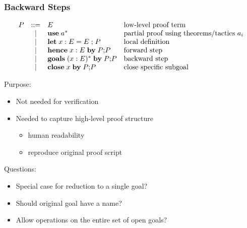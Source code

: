 \documentclass{beamer}
\begin{document}
\begin{frame}\frametitle{Backward Steps}
\[
\begin{array}{lcll}
P       &::=& E & \text{low-level proof term}\\
        &|&   \mathbf{use}\; a^* & \text{partial proof using theorems/tactics $a_i$}\\
        &|&   \mathbf{let}\; x:E=E\; \mathbf{;}\; P & \text{local definition}\\
        &|&   \mathbf{hence}\;x:E\; \mathbf{by}\; P\mathbf{;} P & \text{forward step} \\
        &|&   \mathbf{goals}\;(x:E)^*\; \mathbf{by}\; P\mathbf{;} P & \text{backward step} \\
        &|&   \mathbf{close}\;x\; \mathbf{by}\; P\mathbf{;} P & \text{close specific subgoal} \\
\end{array}
\]

Purpose:
\begin{itemize}
\item Not needed for verification
\item Needed to capture high-level proof structure
  \begin{itemize}
  \item human readability
  \item reproduce original proof script
  \end{itemize}
\end{itemize}

Questions:
\begin{itemize}
\item Special case for reduction to a single goal?
\item Should original goal have a name?
\item Allow operations on the entire set of open goals?
\end{itemize}

\end{frame}
\end{document}
